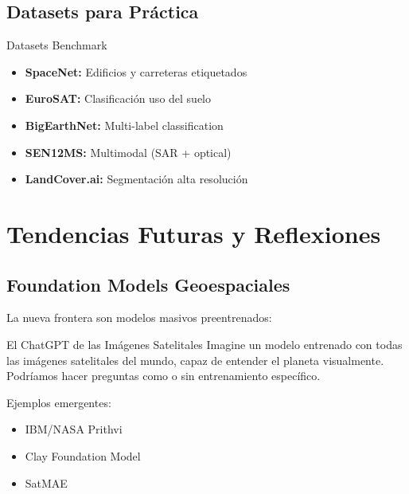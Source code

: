 \documentclass[12pt,a4paper]{article}
\begin{document}
\subsection{Datasets para Práctica}

\begin{conceptbox}{Datasets Benchmark}
\begin{itemize}
    \item \textbf{SpaceNet:} Edificios y carreteras etiquetados
    \item \textbf{EuroSAT:} Clasificación uso del suelo
    \item \textbf{BigEarthNet:} Multi-label classification
    \item \textbf{SEN12MS:} Multimodal (SAR + optical)
    \item \textbf{LandCover.ai:} Segmentación alta resolución
\end{itemize}
\end{conceptbox}

\section{Tendencias Futuras y Reflexiones}

\subsection{Foundation Models Geoespaciales}

La nueva frontera son modelos masivos preentrenados:

\begin{conceptbox}{El ChatGPT de las Imágenes Satelitales}
Imagine un modelo entrenado con todas las imágenes satelitales del mundo, capaz de entender el planeta visualmente. Podríamos hacer preguntas como  o  sin entrenamiento específico.
\end{conceptbox}

Ejemplos emergentes:
\begin{itemize}
    \item IBM/NASA Prithvi
    \item Clay Foundation Model
    \item SatMAE
\end{itemize}
\end{document}
